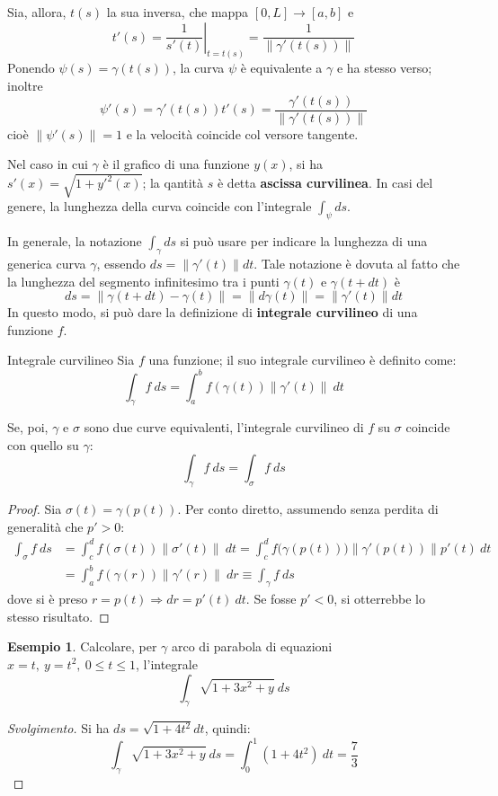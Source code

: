 \documentclass[10pt, a4paper]{scrartcl}
\newenvironment{svolgimento}{\renewcommand\qedsymbol{$\blacksquare$}\begin{proof}[Svolgimento]}{\end{proof}}
\theoremstyle{definition}
\newtheorem{esempio}{Esempio}
\numberwithin{esempio}{section}
\theoremstyle{definition}
\numberwithin{obs}{section}
\numberwithin{nota}{section}
\newcommand*\Eval[3]{\left.#1\right\rvert_{#2}^{#3}}
\numberwithin{equation}{subsection}
\begin{document}
Sia, allora, $t(s) $ la sua inversa, che mappa $\left[ 0, L \right] \to \left[ a,b \right] $ e 
\[
	t'(s) = \Eval{\frac{1}{s'(t)}}{t = t(s)}{}  = \frac{1}{\left\lVert \gamma'(t(s)) \right\rVert }
\] 
Ponendo $\psi (s) = \gamma(t(s))$, la curva $\psi $ \`e equivalente a $\gamma$ e ha stesso verso; inoltre
\[
\psi' (s) = \gamma'(t(s)) t'(s) = \frac{\gamma'(t(s))}{\left\lVert \gamma'(t(s)) \right\rVert }
\] 
cio\`e $\left\lVert \psi '(s) \right\rVert = 1$ e la velocit\`a coincide col versore tangente.

	Nel caso in cui $\gamma$ \`e il grafico di una funzione $y(x)$, si ha $s'(x) = \sqrt{1 + y'^2 (x)} $; la qantit\`a $s$ \`e detta \textbf{ascissa curvilinea}. 
	In casi del genere, la lunghezza della curva coincide con l'integrale $\int_{\psi }  ds$.

	In generale, la notazione $\int_{\gamma} ds$ si pu\`o usare per indicare la lunghezza di una generica curva $\gamma$, essendo $ds = \left\lVert \gamma'(t) \right\rVert dt $.
	Tale notazione \`e dovuta al fatto che la lunghezza del segmento infinitesimo tra i punti $\gamma(t)$ e $\gamma(t+dt)$ \`e
	\[
	ds = \left\lVert \gamma(t+dt) - \gamma(t) \right\rVert = \left\lVert d\gamma(t) \right\rVert  = \left\lVert \gamma'(t) \right\rVert  dt 
	\] 
In questo modo, si pu\`o dare la definizione di \textbf{integrale curvilineo} di una funzione $f$.
\begin{definizione}
	{Integrale curvilineo}{}
	Sia $f$	una funzione; il suo integrale curvilineo \`e definito come:
	\[
	\int_{\gamma} f \ ds = \int_{a} ^b f(\gamma(t)) \left\lVert \gamma' (t)\right\rVert \ dt 
	\] 
\end{definizione}
Se, poi, $\gamma$ e $\sigma $ sono due curve equivalenti, l'integrale curvilineo di $f$ su $\sigma $ coincide con quello su $\gamma$:
\begin{equation}
	\int_{\gamma}  f \ ds = \int_{\sigma } f \ ds
\end{equation}
\begin{proof}
	Sia $\sigma (t) = \gamma(p(t))$. Per conto diretto, assumendo senza perdita di generalit\`a che $p' > 0$:
	\[
		\begin{split}
			\int_{\sigma } f \ ds &= \int_{c} ^d f(\sigma (t)) \left\lVert \sigma '(t) \right\rVert  \ dt = \int_{c} ^d f\big(\gamma(p(t))\big)\left\lVert \gamma'(p(t)) \right\rVert p'(t) \ dt\\
					      &= \int_{a} ^b f(\gamma(r)) \left\lVert \gamma'(r) \right\rVert  \ dr \equiv \int_{\gamma} f \ ds
		\end{split}
	\] 
dove si \`e preso $r = p(t)\Rightarrow dr = p'(t) \ dt $. 
Se fosse $p'<0$, si otterrebbe lo stesso risultato.
\end{proof}
\begin{esempio}
Calcolare, per $\gamma$ arco di parabola di equazioni $x = t  , \ y = t^2, \ 0\le t \le  1$, l'integrale
\[
\int_{\gamma}  \sqrt{1 + 3x^2 +y }  \ ds
\] 
\begin{svolgimento}
	Si ha $ds = \sqrt{1 + 4t^2}  dt  $, quindi:
	\[
	\int_{\gamma} \sqrt{1+ 3x^2 + y}  \ ds = \int_{0} ^1 (1+4t^2) \ dt = \frac{7}{3}
	\] 
	
\end{svolgimento}
\end{esempio}
\end{document}
